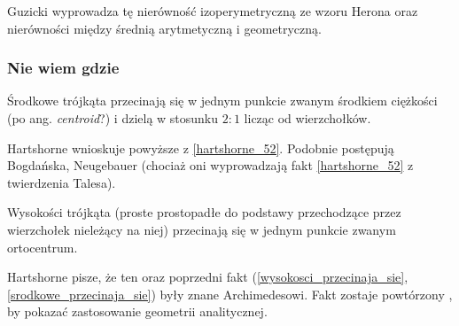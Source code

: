 Guzicki wyprowadza tę nierówność izoperymetryczną ze wzoru Herona oraz nierówności między średnią arytmetyczną i geometryczną.


\subsubsection{Nie wiem gdzie}

\begin{proposition}
	\label{srodkowe_przecinaja_sie}
	Środkowe trójkąta przecinają się w jednym punkcie zwanym środkiem ciężkości (po ang. \emph{centroid}?) i dzielą w stosunku $2 : 1$ licząc od wierzchołków.
\end{proposition}

Hartshorne \cite[s. 53, 54]{hartshorne2000} wnioskuje powyższe z \ref{hartshorne_52}.
Podobnie postępują Bogdańska, Neugebauer (chociaż oni wyprowadzają fakt \ref{hartshorne_52} z twierdzenia Talesa).

\begin{proposition}
	\label{wysokosci_przecinaja_sie}
	Wysokości trójkąta (proste prostopadłe do podstawy przechodzące przez wierzchołek nieleżący na niej) przecinają się w jednym punkcie zwanym ortocentrum.
\end{proposition}

Hartshorne \cite[s. 52, 54]{hartshorne2000} pisze, że ten oraz poprzedni fakt (\ref{wysokosci_przecinaja_sie}, \ref{srodkowe_przecinaja_sie}) były znane Archimedesowi.
Fakt zostaje powtórzony \cite[s. 119-120]{hartshorne2000}, by pokazać zastosowanie geometrii analitycznej.


